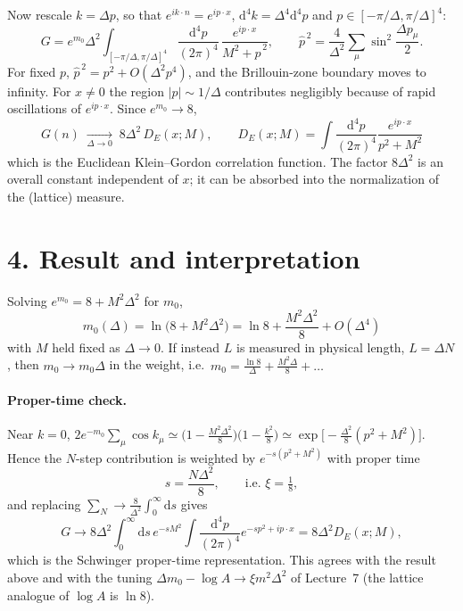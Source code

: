 \documentclass[11pt]{article}
\newcommand{\dd}{\mathrm{d}}
\begin{document}
Now rescale $k=\Delta p$, so that $e^{ik\cdot n}=e^{ip\cdot x}$, $\dd^4k=\Delta^4\dd^4p$ and
$p\in[-\pi/\Delta,\pi/\Delta]^4$:
\begin{equation}
G=e^{m_0}\Delta^{2}\int_{[-\pi/\Delta,\pi/\Delta]^4}\frac{\dd^4p}{(2\pi)^4}\,
\frac{e^{ip\cdot x}}{M^2+\hat p^{\,2}},\qquad
\hat p^{\,2}=\frac{4}{\Delta^2}\sum_\mu\sin^2\frac{\Delta p_\mu}{2}.
\end{equation}
For fixed $p$, $\hat p^{\,2}=p^2+O(\Delta^2p^4)$, and the Brillouin-zone boundary moves to infinity.
For $x\neq0$ the region $|p|\sim1/\Delta$ contributes negligibly because of rapid oscillations of
$e^{ip\cdot x}$. Since $e^{m_0}\to8$,
\begin{equation}
\boxed{\;G(n)\;\xrightarrow[\Delta\to0]{}\;8\Delta^2\,D_E(x;M),\qquad
D_E(x;M)=\int\frac{\dd^4p}{(2\pi)^4}\frac{e^{ip\cdot x}}{p^2+M^2}\;}
\end{equation}
which is the Euclidean Klein--Gordon correlation function. The factor $8\Delta^2$ is an overall
constant independent of $x$; it can be absorbed into the normalization of the (lattice) measure.

\section*{4. Result and interpretation}

Solving $e^{m_0}=8+M^2\Delta^2$ for $m_0$,
\begin{equation}
\boxed{\;m_0(\Delta)=\ln\!\big(8+M^2\Delta^2\big)=\ln 8+\frac{M^2\Delta^2}{8}+O(\Delta^4)\;}
\end{equation}
with $M$ held fixed as $\Delta\to0$. If instead $L$ is measured in physical length, $L=\Delta N$,
then $m_0\to m_0\Delta$ in the weight, i.e.\ $m_0=\frac{\ln 8}{\Delta}+\frac{M^2\Delta}{8}+\dots$

\paragraph{Proper-time check.}
Near $k=0$, $2e^{-m_0}\sum_\mu\cos k_\mu\simeq\big(1-\tfrac{M^2\Delta^2}{8}\big)\big(1-\tfrac{k^2}{8}\big)
\simeq \exp\!\big[-\tfrac{\Delta^2}{8}(p^2+M^2)\big]$. Hence the $N$-step contribution is weighted by
$e^{-s(p^2+M^2)}$ with proper time
\begin{equation}
s=\frac{N\Delta^2}{8},\qquad\text{i.e. } \xi=\tfrac18 ,
\end{equation}
and replacing $\sum_N\to\frac{8}{\Delta^2}\int_0^\infty\dd s$ gives
\begin{equation}
G\to 8\Delta^2\int_0^\infty\dd s\,e^{-sM^2}\int\frac{\dd^4p}{(2\pi)^4}e^{-sp^2+ip\cdot x}=8\Delta^2D_E(x;M),
\end{equation}
which is the Schwinger proper-time representation. This agrees with the result above and with the
tuning $\Delta m_0-\log A\to\xi m^2\Delta^2$ of Lecture~7 (the lattice analogue of $\log A$ is $\ln 8$).
\end{document}
